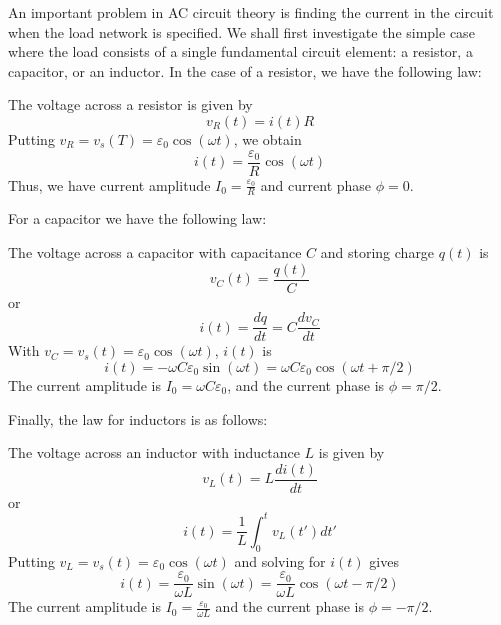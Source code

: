 \documentclass[12pt, a4paper, oneside, openright, titlepage]{book}
\begin{document}
An important problem in AC circuit theory is finding the current in the circuit when the load network is specified. We shall first investigate the simple case where the load consists of a single fundamental circuit element: a resistor, a capacitor, or an inductor. In the case of a resistor, we have the following law:

\begin{thm}
    The voltage across a resistor is given by $$v_R(t) = i(t)R$$ Putting $v_R = v_s(T) = \varepsilon_0\cos(\omega t)$, we obtain $$i(t) = \frac{\varepsilon_0}{R}\cos(\omega t)$$ Thus, we have current amplitude $I_0 = \frac{\varepsilon_0}{R}$ and current phase $\phi = 0$.
\end{thm}

For a capacitor we have the following law:

\begin{thm}
    The voltage across a capacitor with capacitance $C$ and storing charge $q(t)$ is $$v_C(t) = \frac{q(t)}{C}$$ or $$i(t) = \frac{dq}{dt} = C\frac{dv_C}{dt}$$ With $v_C = v_s(t) = \varepsilon_0\cos(\omega t)$, $i(t)$ is $$i(t) = -\omega C\varepsilon_0\sin(\omega t) = \omega C\varepsilon_0\cos(\omega t+\pi/2)$$ The current amplitude is $I_0 = \omega C\varepsilon_0$, and the current phase is $\phi = \pi/2$.
\end{thm}

Finally, the law for inductors is as follows:

\begin{thm}
    The voltage across an inductor with inductance $L$ is given by $$v_L(t) = L\frac{di(t)}{dt}$$ or $$i(t) = \frac{1}{L}\int_0^tv_L(t')dt'$$ Putting $v_L = v_s(t) = \varepsilon_0\cos(\omega t)$ and solving for $i(t)$ gives $$i(t) = \frac{\varepsilon_0}{\omega L}\sin(\omega t) = \frac{\varepsilon_0}{\omega L}\cos(\omega t - \pi/2)$$ The current amplitude is $I_0 = \frac{\varepsilon_0}{\omega L}$ and the current phase is $\phi = -\pi/2$.
\end{thm}
\end{document}
